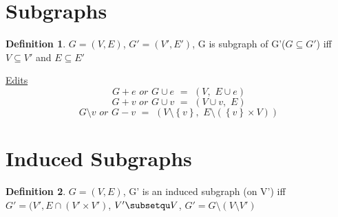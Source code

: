 \documentclass{article}
\theoremstyle{definition}
\newtheorem{definition}{Definition}
\begin{document}
\section{Subgraphs}
\begin{definition}
    $G=(V,E)$, $G' =\left( V' ,E'  \right)$, G is subgraph of G'($G\subseteq G'$) iff $V\subseteq V'$ and $E\subseteq E'$
\end{definition}

\underline{Edits}
$$
G+e\,\,or\,\,G\cup e\,\,=\,\,\left( V,\,\,E\cup e \right) 
$$$$
G+v\,\,or\,\,G\cup v\,\,=\,\,\left( V\cup v,\,\,E \right) 
$$$$
G\setminus v\,\,or\,\,G-v\,\,=\,\,\left( V\setminus \left\{ v \right\} ,\,\,E\setminus \left( \left\{ v \right\} \times V \right) \right) 
$$

\section{Induced Subgraphs}
\begin{definition}
    $G=(V,E)$, G' is an induced subgraph (on V') iff $G'=(V', E\cap (V'\times V')$, $V'\subsetqu V$, $G'=G\setminus \left( V\setminus V' \right) $
\end{definition}
    
\end{document}
